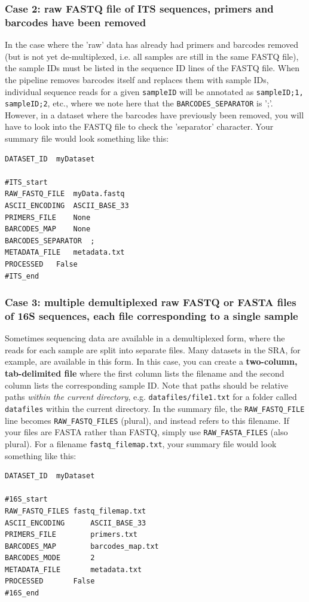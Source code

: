 \documentclass[11pt, oneside]{article}   	%
\begin{document}
\subsubsection{Case 2: raw FASTQ file of ITS sequences, primers and barcodes have been removed}
In the case where the 'raw' data has already had primers and barcodes removed (but is not yet de-multiplexed, i.e. all samples are still in the same FASTQ file), the sample IDs must be listed in the sequence ID lines of the FASTQ file.  When the pipeline removes barcodes itself and replaces them with sample IDs, individual sequence reads for a given {\tt sampleID} will be annotated as {\tt sampleID;1, sampleID;2}, etc., where we note here that the {\tt BARCODES\_SEPARATOR} is ';'.  However, in a dataset where the barcodes have previously been removed, you will have to look into the FASTQ file to check the 'separator' character.  Your summary file would look something like this:

\begin{verbatim}
DATASET_ID	myDataset

#ITS_start
RAW_FASTQ_FILE	myData.fastq
ASCII_ENCODING	ASCII_BASE_33
PRIMERS_FILE	None
BARCODES_MAP	None
BARCODES_SEPARATOR	;
METADATA_FILE	metadata.txt
PROCESSED	False
#ITS_end
\end{verbatim}
		
\subsubsection{Case 3: multiple demultiplexed raw FASTQ or FASTA files of 16S sequences, each file corresponding to a single sample}
Sometimes sequencing data are available in a demultiplexed form, where the reads for each sample are split into separate files.  Many datasets in the SRA, for example, are available in this form.  In this case, you can create a \textbf{two-column, tab-delimited file} where the first column lists the filename and the second column lists the corresponding sample ID.  Note that paths should be relative paths \textit{within the current directory}, e.g. {\tt datafiles/file1.txt} for a folder called {\tt datafiles} within the current directory.  In the summary file, the {\tt RAW\_FASTQ\_FILE} line becomes {\tt RAW\_FASTQ\_FILES} (plural), and instead refers to this filename.  If your files are FASTA rather than FASTQ, simply use {\tt RAW\_FASTA\_FILES} (also plural).  For a filename {\tt fastq\_filemap.txt}, your summary file would look something like this:

\begin{verbatim}
DATASET_ID	myDataset

#16S_start
RAW_FASTQ_FILES	fastq_filemap.txt
ASCII_ENCODING		ASCII_BASE_33
PRIMERS_FILE		primers.txt
BARCODES_MAP		barcodes_map.txt
BARCODES_MODE		2
METADATA_FILE		metadata.txt
PROCESSED		False
#16S_end
\end{verbatim}
\end{document}
